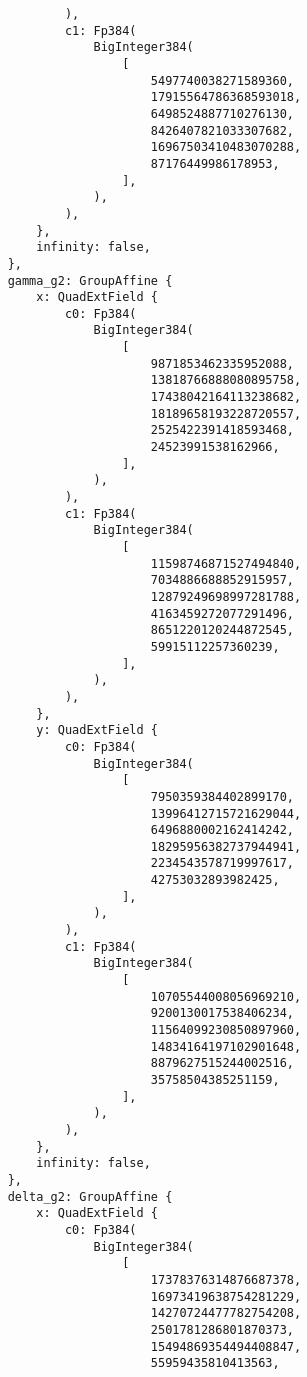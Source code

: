 \documentclass{article}
\begin{document}
\begin{lstlisting}
            ),
            c1: Fp384(
                BigInteger384(
                    [
                        5497740038271589360,
                        17915564786368593018,
                        6498524887710276130,
                        8426407821033307682,
                        16967503410483070288,
                        87176449986178953,
                    ],
                ),
            ),
        },
        infinity: false,
    },
    gamma_g2: GroupAffine {
        x: QuadExtField {
            c0: Fp384(
                BigInteger384(
                    [
                        9871853462335952088,
                        13818766888080895758,
                        17438042164113238682,
                        18189658193228720557,
                        2525422391418593468,
                        24523991538162966,
                    ],
                ),
            ),
            c1: Fp384(
                BigInteger384(
                    [
                        11598746871527494840,
                        7034886688852915957,
                        12879249698997281788,
                        4163459272077291496,
                        8651220120244872545,
                        59915112257360239,
                    ],
                ),
            ),
        },
        y: QuadExtField {
            c0: Fp384(
                BigInteger384(
                    [
                        7950359384402899170,
                        13996412715721629044,
                        6496880002162414242,
                        18295956382737944941,
                        2234543578719997617,
                        42753032893982425,
                    ],
                ),
            ),
            c1: Fp384(
                BigInteger384(
                    [
                        10705544008056969210,
                        9200130017538406234,
                        11564099230850897960,
                        14834164197102901648,
                        8879627515244002516,
                        35758504385251159,
                    ],
                ),
            ),
        },
        infinity: false,
    },
    delta_g2: GroupAffine {
        x: QuadExtField {
            c0: Fp384(
                BigInteger384(
                    [
                        17378376314876687378,
                        16973419638754281229,
                        14270724477782754208,
                        2501781286801870373,
                        15494869354494408847,
                        55959435810413563,

\end{lstlisting}
\end{document}
